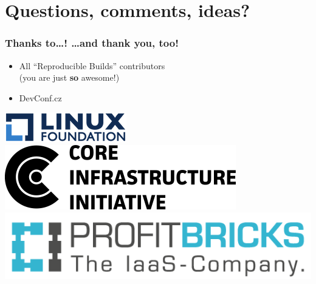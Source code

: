 \documentclass[14pt]{beamer}
\newif\ifplacelogo
\begin{document}
\section{Questions, comments, ideas?}

\placelogotrue

\begin{frame}
 \frametitle{Thanks to…! …and thank \textbf{you}, too!}

 \begin{itemize}
  \item
    {All “Reproducible Builds” contributors \\
        {\small (you are just \textbf{so} awesome!)}}
  \item DevConf.cz
\end{itemize}

 \begin{center}
  \includegraphics[height=0.1\paperheight]{images/linux_foundation_logo.png}
  \hspace{0.1\paperwidth}
  \includegraphics[height=0.1\paperheight]{images/cii_logo.png}
  \hspace{0.1\paperwidth}
  \includegraphics[height=0.1\paperheight]{images/profitbricks_logo.png}
 \end{center}

 \vfill
 \begin{center}
 \end{center}
\end{frame}
\end{document}
